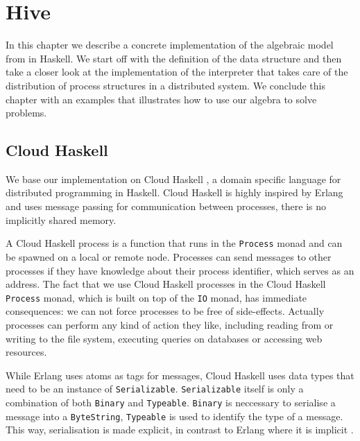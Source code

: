 \chapter{Hive}
In this chapter we describe a concrete implementation of the algebraic model from  in Haskell. We start off with the definition of the data structure and then take a closer look at the implementation of the interpreter that takes care of the distribution of process structures in a distributed system. We conclude this chapter with an examples that illustrates how to use our algebra to solve problems.

\section{Cloud Haskell}
\label{chp:cloud_haskell}
We base our implementation on \textsf{Cloud Haskell} \cite{Epstein:2011:THC:2034675.2034690}, a domain specific language for distributed programming in Haskell. Cloud Haskell is highly inspired by Erlang and uses message passing for communication between processes, there is no implicitly shared memory.

A Cloud Haskell process is a function that runs in the \texttt{Process} monad and can be spawned on a local or remote node. Processes can send messages to other processes if they have knowledge about their process identifier, which serves as an address. The fact that we use \textsf{Cloud Haskell} processes in the \textsf{Cloud Haskell} \texttt{Process} monad, which is built on top of the \texttt{IO} monad, has immediate consequences: we can not force processes to be free of side-effects. Actually processes can perform any kind of action they like, including reading from or writing to the file system, executing queries on databases or accessing web resources.

While Erlang uses atoms as tags for messages, \textsf{Cloud Haskell} uses data types that need to be an instance of \texttt{Serializable}. \texttt{Serializable} itself is only a combination of both \texttt{Binary} and \texttt{Typeable}. \texttt{Binary} is neccessary to serialise a message into a \texttt{ByteString}, \texttt{Typeable} is used to identify the type of a message. This way, serialisation is made explicit, in contrast to Erlang where it is implicit \cite{Epstein:2011:THC:2034675.2034690}.

